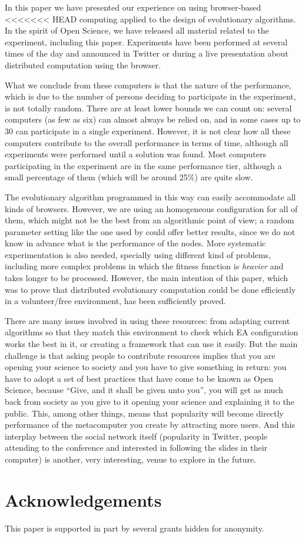 \documentclass{sig-alternate}
\begin{document}
In this paper we have presented our experience on using browser-based
<<<<<<< HEAD
computing applied to the design of evolutionary algorithms. In the
spirit of Open Science, we have released all material related to the
experiment, including this paper. Experiments have been performed at
several times of the day and announced in Twitter or during a live
presentation about distributed computation using the browser. 

What we conclude from these computers is that the nature of the
performance, which is due to the number of persons deciding to
participate in the experiment, is not totally random. There are at
least lower bounds we can count on: several computers (as few as six)
can almost always be relied on, and in some cases up to 30 can
participate in a single experiment. However, it is not clear how all
these computers contribute to the overall performance in terms of
time, although all experiments were performed until a solution was
found. Most computers participating in the experiment are in the same
performance tier, although a small percentage of them (which will be
around 25\%) are quite slow.

The evolutionary algorithm programmed in this way can easily
accommodate all kinds of browsers. However, we are using an homogeneous
configuration for all of them, which might not be the best from an
algorithmic point of view; a random parameter setting like the one
used by \cite{LNCS86720702} could offer better results, since we do
not know in advance what is the performance of the nodes. More
systematic experimentation is also needed, specially using different
kind of problems, including more complex problems in which the fitness
function is {\em heavier} and takes longer to be processed. However,
the main intention of this paper, which was to prove that distributed
evolutionary computation could be done efficiently in a volunteer/free
environment, has been sufficiently proved. 

There are many issues involved in using these resources: from adapting
current algorithms so that they match this environment 
to check which EA configuration works the best in it, or creating a
framework that can use it easily. But the main
challenge is that asking people to contribute resources implies that
you are opening your science to society and you have to give something
in return: you have to adopt a set of best practices that have come to
be known as Open Science, because ``Give, and it shall be given unto
you'', you will get as much back from society as you give to it
opening your science and explaining it to the public. This, among
other things, means that popularity will become directly performance
of the metacomputer you create by attracting more users. And this
interplay between the social network itself (popularity in Twitter,
people attending to the conference and interested in following the
slides in their computer) is another, very interesting, venue to
explore in the future. 

\section{Acknowledgements}

This paper is supported in part by several grants hidden for
anonymity. 



\end{document}

